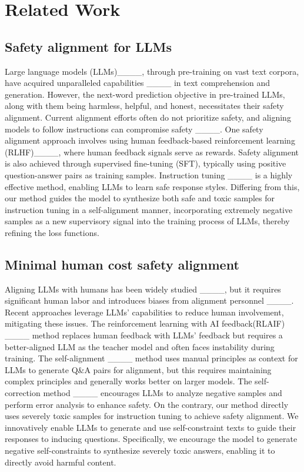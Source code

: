 \section{Related Work}
\label{2}
\subsection{Safety alignment for LLMs}
Large language models (LLMs)____, through pre-training on vast text corpora, have acquired unparalleled capabilities ____ in text comprehension and generation.  However, the next-word prediction objective in pre-trained LLMs, along with them being harmless, helpful, and honest, necessitates their safety alignment. Current alignment efforts often do not prioritize safety, and aligning models to follow instructions can compromise safety ____. One safety alignment approach involves using human feedback-based reinforcement learning (RLHF)____, where human feedback signals serve as rewards. Safety alignment is also achieved through supervised fine-tuning (SFT), typically using positive question-answer pairs as training samples. Instruction tuning ____ is a highly effective method, enabling LLMs to learn safe response styles. Differing from this, our method guides the model to synthesize both safe and toxic samples for instruction tuning in a self-alignment manner, incorporating extremely negative samples as a new supervisory signal into the training process of LLMs, thereby refining the loss functions.

\subsection{Minimal human cost safety alignment}
Aligning LLMs with humans has been widely studied ____, but it requires significant human labor and introduces biases from alignment personnel ____. Recent approaches leverage LLMs' capabilities to reduce human involvement, mitigating these issues. The reinforcement learning with AI feedback(RLAIF) ____ method replaces human feedback with LLMs' feedback but requires a better-aligned LLM as the teacher model and often faces instability during training. The self-alignment ____ method uses manual principles as context for LLMs to generate Q\&A pairs for alignment, but this requires maintaining complex principles and generally works better on larger models. The self-correction method ____ encourages LLMs to analyze negative samples and perform error analysis to enhance safety. On the contrary, our method directly uses severely toxic samples for instruction tuning to achieve safety alignment. We innovatively enable LLMs to generate and use self-constraint texts to guide their responses to inducing questions. Specifically, we encourage the model to generate negative self-constraints to synthesize severely toxic answers, enabling it to directly avoid harmful content.

